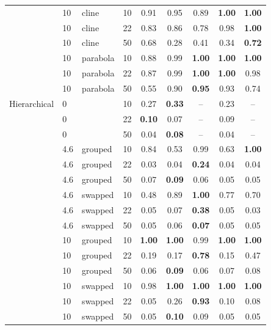 \begin{table}[ht]
\begin{tabular}{lllrccccc}
 & 10 & cline & 10 & 0.91 & 0.95 & 0.89 & \textbf{1.00} & \textbf{1.00} \\
 & 10 & cline & 22 & 0.83 & 0.86 & 0.78 & 0.98 & \textbf{1.00} \\
 & 10 & cline & 50 & 0.68 & 0.28 & 0.41 & 0.34 & \textbf{0.72} \\
 & 10 & parabola & 10 & 0.88 & 0.99 & \textbf{1.00} & \textbf{1.00} & \textbf{1.00} \\
 & 10 & parabola & 22 & 0.87 & 0.99 & \textbf{1.00} & \textbf{1.00} & 0.98 \\
 & 10 & parabola & 50 & 0.55 & 0.90 & \textbf{0.95} & 0.93 & 0.74 \\
\midrule
Hierarchical & 0 &  & 10 & 0.27 & \textbf{0.33} & -- & 0.23 & -- \\
 & 0 &  & 22 & \textbf{0.10} & 0.07 & -- & 0.09 & -- \\
 & 0 &  & 50 & 0.04 & \textbf{0.08} & -- & 0.04 & -- \\
 & 4.6 & grouped & 10 & 0.84 & 0.53 & 0.99 & 0.63 & \textbf{1.00} \\
 & 4.6 & grouped & 22 & 0.03 & 0.04 & \textbf{0.24} & 0.04 & 0.04 \\
 & 4.6 & grouped & 50 & 0.07 & \textbf{0.09} & 0.06 & 0.05 & 0.05 \\
 & 4.6 & swapped & 10 & 0.48 & 0.89 & \textbf{1.00} & 0.77 & 0.70 \\
 & 4.6 & swapped & 22 & 0.05 & 0.07 & \textbf{0.38} & 0.05 & 0.03 \\
 & 4.6 & swapped & 50 & 0.05 & 0.06 & \textbf{0.07} & 0.05 & 0.05 \\
 & 10 & grouped & 10 & \textbf{1.00} & \textbf{1.00} & 0.99 & \textbf{1.00} & \textbf{1.00} \\
 & 10 & grouped & 22 & 0.19 & 0.17 & \textbf{0.78} & 0.15 & 0.47 \\
 & 10 & grouped & 50 & 0.06 & \textbf{0.09} & 0.06 & 0.07 & 0.08 \\
 & 10 & swapped & 10 & 0.98 & \textbf{1.00} & \textbf{1.00} & \textbf{1.00} & \textbf{1.00} \\
 & 10 & swapped & 22 & 0.05 & 0.26 & \textbf{0.93} & 0.10 & 0.08 \\
 & 10 & swapped & 50 & 0.05 & \textbf{0.10} & 0.09 & 0.05 & 0.05 \\
\bottomrule
\end{tabular}
\end{table}
